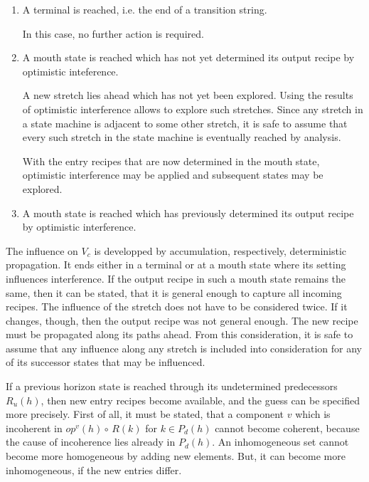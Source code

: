 \documentclass[12pt,a4paper]{scrartcl}
\begin{document}
\begin{enumerate}
  \item A terminal is reached, i.e. the end of a transition string.

        In this case, no further action is required. 

  \item A mouth state is reached which has not yet determined its output
        recipe by optimistic inteference.

        A new stretch lies ahead which has not yet been explored. Using the
        results of optimistic interference allows to explore such stretches.
        Since any stretch in a state machine is adjacent to some other stretch,
        it is safe to assume that every such stretch in the state machine is
        eventually reached by analysis. 

        With the entry recipes that are now determined in the mouth state, 
        optimistic interference may be applied and subsequent states 
        may be explored.

  \item A mouth state is reached which has previously determined its
        output recipe by optimistic interference.
\end{enumerate}

The influence on $V_c$ is developped by accumulation, respectively, deterministic
propagation. It ends either in a terminal or at a mouth state where its 
setting influences interference. If the output recipe in such a mouth
state remains the same, then it can be stated, that it is general enough
to capture all incoming recipes. The influence of the stretch does not have
to be considered twice. If it changes, though, then the output recipe was
not general enough. The new recipe must be propagated along its paths ahead.
From this consideration, it is safe to assume that any influence along any
stretch is included into consideration for any of its successor states 
that may be influenced.

If a previous horizon state is reached through its undetermined predecessors
$R_u(h)$, then new entry recipes become available, and the guess can be
specified more precisely. First of all, it must be stated, that a component $v$
which is incoherent in $op^v(h)\circ\,R(k)$ for $k\in P_d(h)$ cannot become
coherent, because the cause of incoherence lies already in $P_d(h)$. An
inhomogeneous set cannot become more homogeneous by adding new elements. But,
it can become more inhomogeneous, if the new entries differ. 
\end{document}

